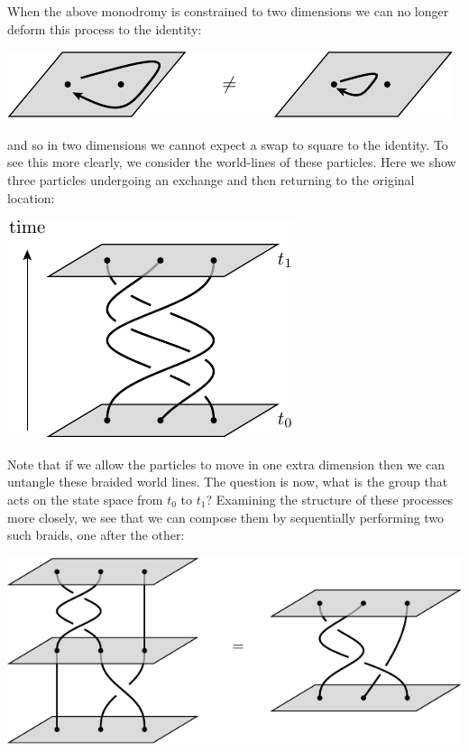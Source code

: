 \documentclass[aps, prl, letterpaper, twocolumn, superscriptaddress, notitlepage, 10pt]{revtex4-1}
\begin{document}
When the above monodromy is constrained to two dimensions
we can no longer deform this process to the identity:
\begin{center}
\includegraphics[]{pic-monodromy2d.pdf}
\end{center}
and so in two dimensions we cannot expect a swap to square to the identity.
To see this more clearly,
we consider the world-lines of these particles.
Here we show three particles undergoing an exchange and then
returning to the original location:
\begin{center}
\includegraphics[]{pic-braid-worldlines.pdf}
\end{center}
Note that if we allow the particles to move in one extra
dimension then we can untangle these braided world lines.
The question is now, what is the group that acts on the
state space from $t_0$ to $t_1$?
Examining the structure of these processes more closely,
we see that we can compose them by sequentially performing
two such braids, one after the other:
\begin{center}
\includegraphics[]{pic-braid-compose.pdf}
\end{center}
\end{document}
